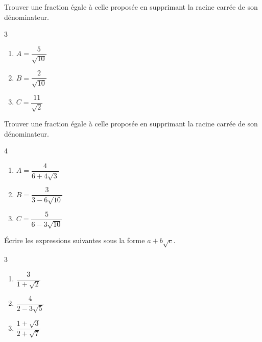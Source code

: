 {%
\begin{Exercice}Trouver une fraction égale à celle proposée en supprimant la racine carrée de son dénominateur.
\begin{multicols}{3}
\begin{enumerate}[itemsep=1em,label={}]
	\item \begin{minipage}[t]{\linewidth} $A=\dfrac{ 5 }{\sqrt{10}} $ \end{minipage}
	\item \begin{minipage}[t]{\linewidth} $B=\dfrac{ 2 }{\sqrt{10}} $ \end{minipage}
	\item \begin{minipage}[t]{\linewidth} $C=\dfrac{ 11 }{\sqrt{2}} $ \end{minipage}
\end{enumerate}
\end{multicols}
\end{Exercice}

\begin{Exercice}
Trouver une fraction égale à celle proposée en supprimant la racine carrée de son dénominateur.
\begin{multicols}{4}
\begin{enumerate}[itemsep=1em,label={}]
	\item \begin{minipage}[t]{\linewidth} $A=\dfrac{ 4 }{6+4\sqrt{3}} $  \end{minipage}
	\item \begin{minipage}[t]{\linewidth} $B=\dfrac{ 3 }{3-6\sqrt{10}} $  \end{minipage}
	\item \begin{minipage}[t]{\linewidth} $C=\dfrac{ 5 }{6-3\sqrt{10}} $  \end{minipage}
\end{enumerate}
\end{multicols}
\end{Exercice}

\begin{Exercice}
Écrire les expressions suivantes sous la forme $a + b\sqrt{c}$.
\vspace{-0.5cm}
\begin{multicols}{3}
\begin{enumerate}
    \item $\dfrac{3}{1 + \sqrt{2}}$
    \item $\dfrac{4}{2 - 3\sqrt{5}}$
    \item $\dfrac{1 + \sqrt{3}}{2 + \sqrt{7}}$
\end{enumerate}
\end{multicols}
\end{Exercice}

}
